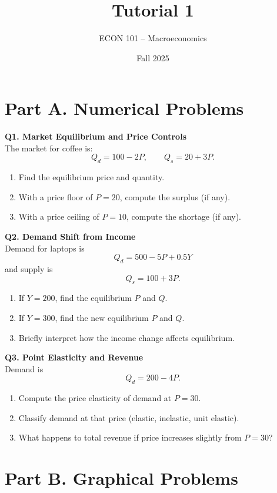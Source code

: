 \documentclass[11pt]{article}
\title{Tutorial 1}
\author{ECON 101 -- Macroeconomics}
\date{Fall 2025}
\begin{document}
\maketitle



\section*{Part A. Numerical Problems}

\textbf{Q1. Market Equilibrium and Price Controls}\\
The market for coffee is:
\[
Q_d = 100 - 2P, \qquad Q_s = 20 + 3P.
\]
\begin{enumerate}[label=(\alph*)]
\item Find the equilibrium price and quantity.
\item With a price floor of $P=20$, compute the surplus (if any).
\item With a price ceiling of $P=10$, compute the shortage (if any).
\end{enumerate}

\bigskip

\noindent \textbf{Q2. Demand Shift from Income}\\
Demand for laptops is
\[
Q_d = 500 - 5P + 0.5Y
\]
and supply is
\[
Q_s = 100 + 3P.
\]
\begin{enumerate}[label=(\alph*)]
\item If $Y=200$, find the equilibrium $P$ and $Q$.
\item If $Y=300$, find the new equilibrium $P$ and $Q$.
\item Briefly interpret how the income change affects equilibrium.
\end{enumerate}

\bigskip

\noindent \textbf{Q3. Point Elasticity and Revenue}\\
Demand is
\[
Q_d = 200 - 4P.
\]
\begin{enumerate}[label=(\alph*)]
\item Compute the price elasticity of demand at $P=30$.
\item Classify demand at that price (elastic, inelastic, unit elastic).
\item What happens to total revenue if price increases slightly from $P=30$?
\end{enumerate}

\section*{Part B. Graphical Problems}
\end{document}
